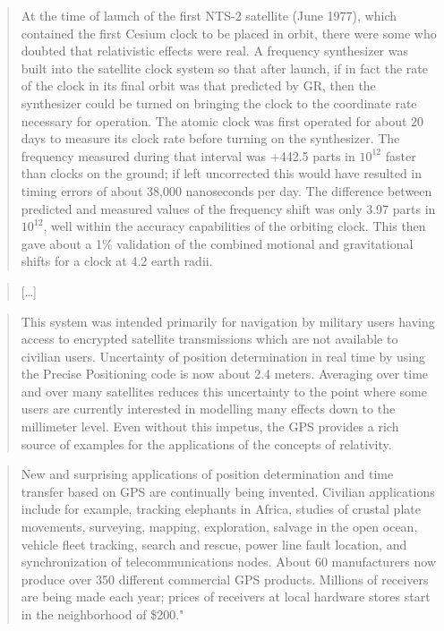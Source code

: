 \documentclass{article}
\begin{document}
\begin{quote}
At the time of launch of the first NTS-2 satellite (June 1977), which
contained the first Cesium clock to be placed in orbit, there were some
who doubted that relativistic effects were real. A frequency synthesizer
was built into the satellite clock system so that after launch, if in
fact the rate of the clock in its final orbit was that predicted by GR,
then the synthesizer could be turned on bringing the clock to the
coordinate rate necessary for operation. The atomic clock was first
operated for about 20 days to measure its clock rate before turning on
the synthesizer. The frequency measured during that interval was +442.5
parts in \(10^{12}\) faster than clocks on the ground; if left
uncorrected this would have resulted in timing errors of about 38,000
nanoseconds per day. The difference between predicted and measured
values of the frequency shift was only 3.97 parts in \(10^{12}\), well
within the accuracy capabilities of the orbiting clock. This then gave
about a 1\% validation of the combined motional and gravitational shifts
for a clock at 4.2 earth radii.
\end{quote}

\begin{quote}
{[}\ldots{]}
\end{quote}

\begin{quote}
This system was intended primarily for navigation by military users
having access to encrypted satellite transmissions which are not
available to civilian users. Uncertainty of position determination in
real time by using the Precise Positioning code is now about 2.4 meters.
Averaging over time and over many satellites reduces this uncertainty to
the point where some users are currently interested in modelling many
effects down to the millimeter level. Even without this impetus, the GPS
provides a rich source of examples for the applications of the concepts
of relativity.
\end{quote}

\begin{quote}
New and surprising applications of position determination and time
transfer based on GPS are continually being invented. Civilian
applications include for example, tracking elephants in Africa, studies
of crustal plate movements, surveying, mapping, exploration, salvage in
the open ocean, vehicle fleet tracking, search and rescue, power line
fault location, and synchronization of telecommunications nodes. About
60 manufacturers now produce over 350 different commercial GPS products.
Millions of receivers are being made each year; prices of receivers at
local hardware stores start in the neighborhood of \$200."
\end{quote}
\end{document}
